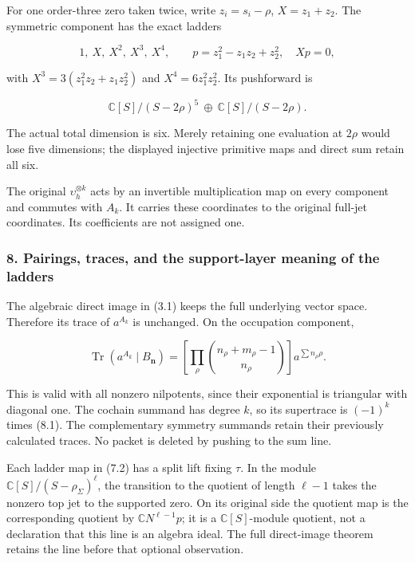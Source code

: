 For one order-three zero taken twice, write \(z_i=s_i-\rho\),
\(X=z_1+z_2\). The symmetric component has the exact ladders

\[1,\ X,\ X^2,\ X^3,\ X^4,\qquad
p=z_1^2-z_1z_2+z_2^2,\quad Xp=0,\tag{7.7}\]

with \(X^3=3(z_1^2z_2+z_1z_2^2)\) and \(X^4=6z_1^2z_2^2\). Its
pushforward is

\[\mathbb C[S]/(S-2\rho)^5\ \oplus\ \mathbb C[S]/(S-2\rho).\tag{7.8}\]

The actual total dimension is six. Merely retaining one evaluation at
\(2\rho\) would lose five dimensions; the displayed injective primitive
maps and direct sum retain all six.

The original \(\upsilon_h^{\otimes k}\) acts by an invertible
multiplication map on every component and commutes with \(A_k\). It
carries these coordinates to the original full-jet coordinates. Its
coefficients are not assigned one.

\subsubsection{8. Pairings, traces, and the support-layer meaning of the
ladders}\label{spectral_sum_full:pairings-traces-and-the-support-layer-meaning-of-the-ladders}

The algebraic direct image in (3.1) keeps the full underlying vector
space. Therefore its trace of \(a^{A_k}\) is unchanged. On the
occupation component,

\[\operatorname{Tr}(a^{A_k}\mid B_{\mathbf n})
=\left[\prod_\rho\binom{n_\rho+m_\rho-1}{n_\rho}\right]
 a^{\sum n_\rho\rho}.\tag{8.1}\]

This is valid with all nonzero nilpotents, since their exponential is
triangular with diagonal one. The cochain summand has degree \(k\), so
its supertrace is \((-1)^k\) times (8.1). The complementary symmetry
summands retain their previously calculated traces. No packet is deleted
by pushing to the sum line.

Each ladder map in (7.2) has a split lift fixing \(\tau\). In the module
\(\mathbb C[S]/(S-\rho_\Sigma)^\ell\), the transition to the quotient of
length \(\ell-1\) takes the nonzero top jet to the supported zero. On
its original side the quotient map is the corresponding quotient by
\(\mathbb C N^{\ell-1}p\); it is a \(\mathbb C[S]\)-module quotient, not
a declaration that this line is an algebra ideal. The full direct-image
theorem retains the line before that optional observation.

